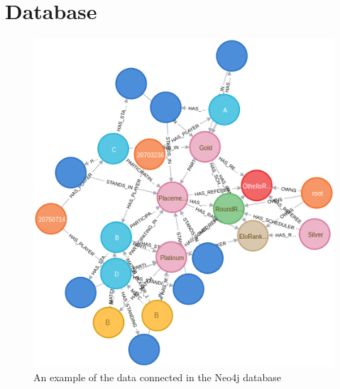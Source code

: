 \documentclass[a4paper, 11pt]{report}
\begin{document}
\section{Database}

\begin{figure}[H]
	\centering
	\includegraphics[scale=0.55]{graph-ex.png}
	\caption{An example of the data connected in the Neo4j database}
	\label{fig:database}
\end{figure}

\printbibliography
\end{document}
